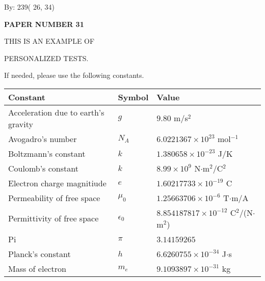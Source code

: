 \documentclass[12pt]{article}
\begin{document}
   
\hspace{1.0in} By: 
         239(         26,          34)
   
   
   
   
\newpage 
\setcounter{page}{ 
    31001 } 
   
   
   
   
 {\textbf{ \Large{ PAPER NUMBER          31 }}}
   
   
\vspace{0.2in}
   
   
   
   
   
   
   
   
 \vspace{0.2in}
 
 
{\Huge  THIS IS AN EXAMPLE OF}
 
{\Huge  PERSONALIZED TESTS. }
 
If needed, please use the following constants.
 
 
 
\noindent\begin{tabular}{|l|l|l|}
\hline
Constant & Symbol & Value \\
\hline
Acceleration due to earth's gravity &
$g$ &
 $ 9.80 $
m/s$^2$ \\
\hline
Avogadro's number &
$N_A$ &
 $ 6.0221367 \times 10^{23} $
mol$^{-1}$ \\
\hline
Boltzmann's constant &
$k$ &
 $ 1.380658 \times 10^{-23} $
J/K \\
\hline
Coulomb's constant &
$k$ &
 $ 8.99 \times 10^{9} $
N$\cdot $m$^2$/C$^2$ \\
\hline
Electron charge magnitiude &
$e$ &
 $ 1.60217733 \times 10^{-19} $
C \\
\hline
Permeability of free space &
$\mu _0$ &
 $ 1.25663706 \times 10^{-6} $
T$\cdot $m/A \\
\hline
Permittivity of free space &
$\epsilon _0$ &
 $ 8.854187817 \times 10^{-12} $
C$^2$/(N$\cdot $m$^2$) \\
\hline
Pi &
$\pi$ &
 $ 3.14159265 $
$ $ \\
\hline
Planck's constant &
$h$ &
 $ 6.6260755 \times 10^{-34} $
J$\cdot $s \\
\hline
Mass of electron &
$m_e$ &
 $ 9.1093897 \times 10^{-31} $
kg \\
\hline
\end{tabular}
 
\end{document}
